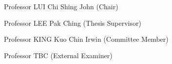 \noindent Professor LUI Chi Shing John (Chair)

\noindent Professor LEE Pak Ching (Thesis Supervisor)

\noindent Professor KING Kuo Chin Irwin (Committee Member)

\noindent Professor TBC (External Examiner)
